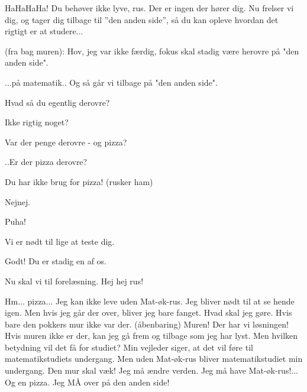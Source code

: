\documentclass[a4paper,11pt]{article}
\begin{document}
\begin{sketch}
 HaHaHaHa! Du behøver ikke lyve, rus. Der er ingen der hører dig. Nu frelser vi dig, og tager dig tilbage til ''den anden side'', så du kan opleve hvordan det rigtigt er at studere...


 (fra bag muren): Hov, jeg var ikke færdig, fokus skal stadig være herovre på "den anden side".


 ...på matematik.. Og så går vi tilbage på "den anden side".


 Hvad så du egentlig derovre?

 Ikke rigtig noget?

 Var der penge derovre - og pizza?

 ..Er der pizza derovre?

 Du har ikke brug for pizza! (rusker ham)

 Nejnej.

 Puha!

 Vi er nødt til lige at teste dig.


 Godt! Du er stadig en af os.

 Nu skal vi til forelæsning. Hej hej rus!


 Hm... pizza... Jeg kan ikke leve uden Mat-øk-rus. Jeg bliver nødt til at se hende igen. Men hvis jeg går der over, bliver jeg bare fanget. Hvad skal jeg gøre. Hvis bare den pokkers mur ikke var der. (åbenbaring) Muren! Der har vi løsningen! Hvis muren ikke er der, kan jeg gå frem og tilbage som jeg har lyst. Men hvilken betydning vil det få for studiet? Min vejleder siger, at det vil føre til matematikstudiets undergang. Men uden Mat-øk-rus bliver matematikstudiet min undergang. Den mur skal væk! Jeg må ændre verden. Jeg må have Mat-øk-rus!... Og en pizza. Jeg MÅ over på den anden side!

\end{sketch}
\end{document}

